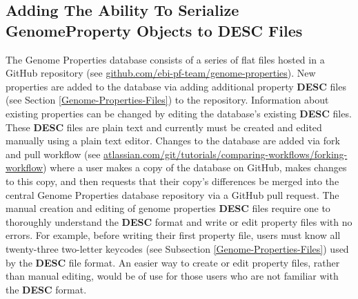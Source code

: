 \subsection{Adding The Ability To Serialize GenomeProperty Objects to DESC 
Files}

The Genome Properties database consists of a series of flat files hosted in a 
GitHub repository (see 
\href{http://github.com/ebi-pf-team/genome-properties}{github.com/ebi-pf-team/genome-properties}). 
New properties are added to the database via adding additional property 
\textbf{DESC} files (see Section \ref{Genome-Properties-Files}) to the 
repository. Information about existing properties can be changed by editing the 
database's existing \textbf{DESC} files. These \textbf{DESC} files are plain 
text and currently must be created and edited manually using a plain text 
editor. Changes to the database are added via fork and pull workflow (see 
\href{https://www.atlassian.com/git/tutorials/comparing-workflows/forking-workflow}{atlassian.com/git/tutorials/comparing-workflows/forking-workflow}) 
where a user makes a copy of the database on GitHub, makes changes to this copy, 
and then requests that their copy's differences be merged into the central 
Genome Properties database repository via a GitHub pull request. The manual 
creation and editing of genome properties \textbf{DESC} files require one to 
thoroughly understand the \textbf{DESC} format and write or edit property files 
with no errors. For example, before writing their first property file, users 
must know all twenty-three two-letter keycodes (see Subsection 
\ref{Genome-Properties-Files}) used by the \textbf{DESC} file format. An easier 
way to create or edit property files, rather than manual editing, would be of 
use for those users who are not familiar with the \textbf{DESC} format.

